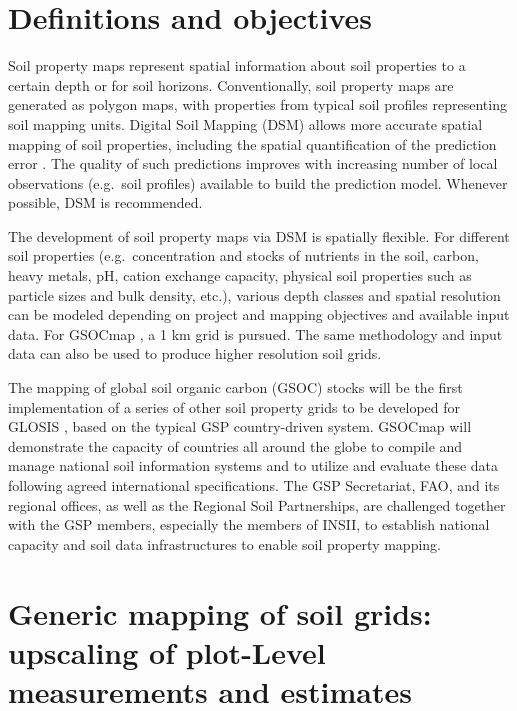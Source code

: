 \documentclass[10pt,b5paper,]{book}
\theoremstyle{definition}
\theoremstyle{definition}
\theoremstyle{definition}
\theoremstyle{remark}
\begin{document}
\hypertarget{definitions-and-objectives}{%
\section{Definitions and objectives}\label{definitions-and-objectives}}

 Soil property maps represent spatial
information about soil properties to a certain depth or for soil
horizons. Conventionally, soil property maps are
generated as polygon maps, with properties from typical soil profiles
representing soil mapping units. Digital Soil Mapping (DSM)
 allows more accurate spatial mapping
of soil properties, including the spatial quantification of the
prediction error . The quality of such
predictions improves with increasing number of local observations
(e.g.~soil profiles) available to build the prediction
model. Whenever possible, DSM is recommended.

The development of soil property maps via DSM is spatially flexible. For
different soil properties (e.g.~concentration and stocks of nutrients in
the soil, carbon, heavy metals, pH, cation exchange capacity, physical
soil properties such as particle sizes and bulk density, etc.), various
depth classes and spatial resolution can be modeled depending on project
and mapping objectives and available input data. For GSOCmap
, a 1 km grid is
pursued. The same methodology and input data can also be used to produce
higher resolution soil grids.

The mapping of global soil organic carbon (GSOC) stocks will be the
first implementation of a series of other soil property grids to be
developed for GLOSIS , based
on the typical GSP country-driven system. GSOCmap will demonstrate the
capacity of countries all around the globe to compile and manage
national soil information systems and to utilize and evaluate these data
following agreed international specifications. The GSP Secretariat, FAO,
and its regional offices, as well as the Regional Soil Partnerships, are
challenged together with the GSP members, especially the members of
INSII, to establish national capacity and soil data infrastructures to
enable soil property mapping. 

\hypertarget{generic-mapping-of-soil-grids-upscaling-of-plot-level-measurements-and-estimates}{%
\section{Generic mapping of soil grids: upscaling of plot-Level
measurements and
estimates}\label{generic-mapping-of-soil-grids-upscaling-of-plot-level-measurements-and-estimates}}
\end{document}
